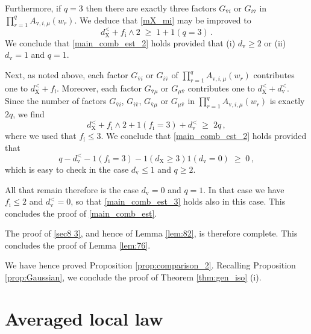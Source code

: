 \documentclass[11pt]{article} %
\numberwithin{equation}{section}
\numberwithin{figure}{section}
\theoremstyle{plain} %
\theoremstyle{definition} %
\newcommand{\f}[1]{\boldsymbol{\mathrm{#1}}} %
\renewcommand{\leq}{\leqslant}
\renewcommand{\geq}{\geqslant}
\newcommand{\ind}[1]{\f 1 (#1)}
\begin{document}
Furthermore, if $q = 3$ then there are exactly three factors $G_{\bar {\f v} i}$ or $G_{i \bar {\f v}}$ in $\prod_{r = 1}^q A_{\f v,i,\mu}(w_r)$. We deduce that \eqref{mX_mi} may be improved to
\begin{equation*}
d_{\f X}^< + f_{\f i} \wedge 2 \;\geq\; 1 + \ind{q = 3}\,.
\end{equation*}
We conclude that \eqref{main_comb_est_2} holds provided that (i) $d_{\f v} \geq 2$ or (ii) $d_{\f v} = 1$ and $q = 1$.

Next, as noted above, each factor $G_{\bar {\f v} i}$ or $G_{i \bar {\f v}}$ of $\prod_{r = 1}^q A_{\f v,i,\mu}(w_r)$ contributes one to $d_{\f X}^< + f_{\f i}$. Moreover, each factor $G_{\bar {\f v} \mu}$ or $G_{\mu \bar {\f v}}$ contributes one to $d_{\f X}^< + d_{\f v}^<$. Since the number of factors $G_{\bar {\f v} i}$, $G_{i \bar {\f v}}$, $G_{\bar {\f v} \mu}$ or $G_{\mu \bar {\f v}}$ in $\prod_{r = 1}^q A_{\f v,i,\mu}(w_r)$ is exactly $2 q$, we find
\begin{equation*}
d_{\f X}^< + f_{\f i} \wedge 2 + \ind{f_{\f i} = 3} + d_{\f v}^< \;\geq\; 2q\,,
\end{equation*}
where we used that $f_{\f i} \leq 3$. We conclude that \eqref{main_comb_est_2} holds provided that
\begin{equation} \label{main_comb_est_3}
q - d_{\f v}^< - \ind{f_{\f i} = 3}
- \ind{d_{\f X} \geq 3} \ind{d_{\f v} = 0} \;\geq\; 0\,,
\end{equation}
which is easy to check in the case $d_{\f v} \leq 1$ and $q \geq 2$.

All that remain therefore is the case $d_{\f v} = 0$ and $q = 1$. In that case we have $f_{\f i} \leq 2$ and $d_{\f v}^< = 0$, so that \eqref{main_comb_est_3} holds also in this case. This concludes the proof of \eqref{main_comb_est}.

The proof of \eqref{sec8 3}, and hence of Lemma \ref{lem:82}, is therefore complete. This concludes the proof of Lemma \ref{lem:76}.

We have hence proved Proposition \ref{prop:comparison_2}. Recalling Proposition \ref{prop:Gaussian}, we conclude the proof of Theorem \ref{thm:gen_iso} (i).




\section{Averaged local law} \label{sec:avg_proof}
\end{document}
